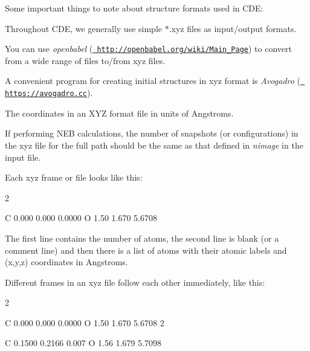 Some important things to note about structure formats used in C\+DE\+:


\begin{DoxyItemize}
\item Throughout C\+DE, we generally use simple $\ast$.xyz files as input/output formats.
\item You can use {\itshape openbabel} (\href{http://openbabel.org/wiki/Main_Page}{\texttt{ http\+://openbabel.\+org/wiki/\+Main\+\_\+\+Page}}) to convert from a wide range of files to/from xyz files.
\item A convenient program for creating initial structures in xyz format is {\itshape Avogadro} (\href{https://avogadro.cc}{\texttt{ https\+://avogadro.\+cc}}).
\item The coordinates in an X\+YZ format file in units of Angstroms.
\item If performing N\+EB calculations, the number of snapshots (or configurations) in the xyz file for the full path should be the same as that defined in {\itshape nimage} in the input file.
\item Each xyz frame or file looks like this\+: \begin{DoxyVerb}  2

  C 0.000  0.000 0.0000
  O 1.50   1.670 5.6708
\end{DoxyVerb}

\item The first line contains the number of atoms, the second line is blank (or a comment line) and then there is a list of atoms with their atomic labels and (x,y,z) coordinates in Angstroms.
\item Different frames in an xyz file follow each other immediately, like this\+: \begin{DoxyVerb}  2

  C 0.000  0.000 0.0000
  O 1.50   1.670 5.6708
  2

  C 0.1500  0.2166 0.007
  O 1.56  1.679  5.7098
\end{DoxyVerb}
 
\end{DoxyItemize}